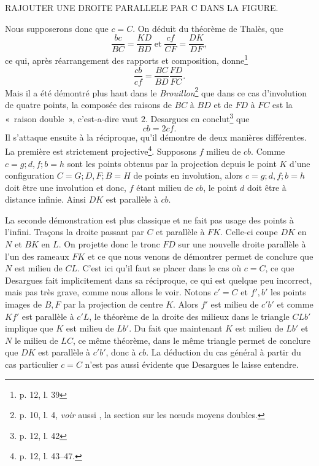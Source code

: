 \documentclass[12pt, a4paper]{article}
\begin{document}
RAJOUTER UNE DROITE PARALLELE PAR C DANS LA FIGURE.

Nous supposerons donc que $c=C$. On déduit du théorème de Thalès, que
\[
\frac{bc}{BC}=\frac{KD}{BD}\;\mbox{et}\;\frac{cf}{CF}=\frac{DK}{DF},
\]
ce qui, après réarrangement des rapports et composition, donne\footnote{p. 12, l. 39}
\[
\frac{cb}{cf}=\frac{BC}{BD}\frac{FD}{FC}.
\]
Mais il a été démontré plus haut dans le \textit{Brouillon}\footnote{p. 10, l. 4, \textit{voir} aussi \cite{anglade-briend-1}, la section sur les n{\oe}uds moyens doubles.} que dans ce cas d'involution de quatre points, la composée des raisons de $BC$ à $BD$ et de $FD$ à $FC$ est la «~raison double~», c'est-a-dire vaut $2$. Desargues en conclut\footnote{p. 12, l. 42} que
\[
cb=2cf.
\]
Il s'attaque ensuite à la réciproque, qu'il démontre de deux manières différentes. La première est strictement projective\footnote{p. 12, l. 43--47.}. Supposons $f$ milieu de $cb$. Comme $c=g; d, f; b=h$ sont les points obtenus par la projection depuis le point $K$ d'une configuration $C=G; D,F; B=H$ de points en involution, alors $c=g; d, f ; b=h$ doit être une involution et donc, $f$ étant milieu de $cb$, le point $d$ doit être à distance infinie. Ainsi $DK$ est parallèle à $cb$.

La seconde démonstration est plus classique et ne fait pas usage des points à l'infini. Traçons la droite passant par $C$ et parallèle à $FK$. Celle-ci coupe $DK$ en $N$ et $BK$ en $L$. On projette donc le tronc $FD$ sur une nouvelle droite parallèle à l'un des rameaux $FK$ et ce que nous venons de démontrer permet de conclure que $N$ est milieu de $CL$. C'est ici qu'il faut se placer dans le cas où $c=C$, ce que Desargues fait implicitement dans sa réciproque, ce qui est quelque peu incorrect, mais pas très grave, comme nous allons le voir. Notons $c'=C$ et $f',b'$ les points images de $B,F$ par la projection de centre $K$. Alors $f'$ est milieu de $c'b'$ et comme $Kf'$ est parallèle à $c'L$, le théorème de la droite des milieux dans le triangle $CLb'$ implique que $K$ est milieu de $Lb'$. Du fait que maintenant $K$ est milieu de $Lb'$ et $N$ le milieu de $LC$, ce même théorème, dans le même triangle permet de conclure que $DK$ est parallèle à $c'b'$, donc à $cb$. La déduction du cas général à partir du cas particulier $c=C$ n'est pas aussi évidente que Desargues le laisse entendre.
\end{document}
